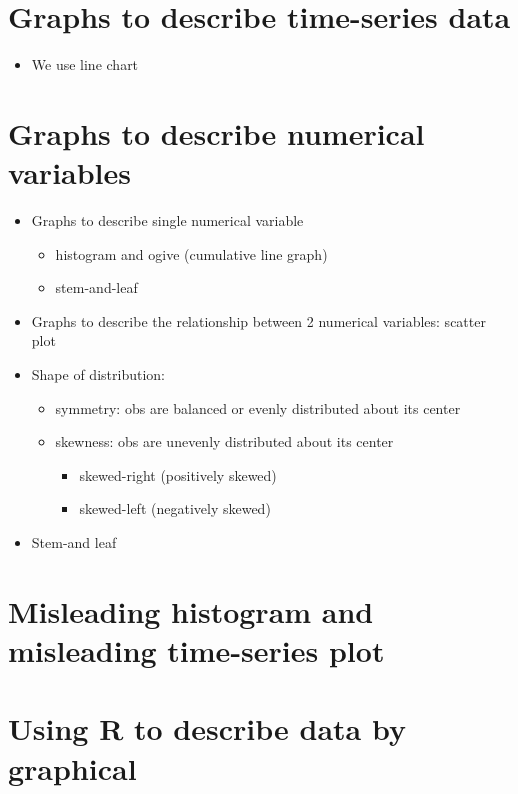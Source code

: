 \documentclass[
]{article}
\providecommand{\tightlist}{%
  \setlength{\itemsep}{0pt}\setlength{\parskip}{0pt}}
\begin{document}
\hypertarget{graphs-to-describe-time-series-data}{%
\section{Graphs to describe time-series
data}\label{graphs-to-describe-time-series-data}}

\begin{itemize}
\tightlist
\item
  We use line chart
\end{itemize}

\hypertarget{graphs-to-describe-numerical-variables}{%
\section{Graphs to describe numerical
variables}\label{graphs-to-describe-numerical-variables}}

\begin{itemize}
\tightlist
\item
  Graphs to describe single numerical variable

  \begin{itemize}
  \tightlist
  \item
    histogram and ogive (cumulative line graph)
  \item
    stem-and-leaf
  \end{itemize}
\item
  Graphs to describe the relationship between 2 numerical variables:
  scatter plot
\item
  Shape of distribution:

  \begin{itemize}
  \tightlist
  \item
    symmetry: obs are balanced or evenly distributed about its center
  \item
    skewness: obs are unevenly distributed about its center

    \begin{itemize}
    \tightlist
    \item
      skewed-right (positively skewed)
    \item
      skewed-left (negatively skewed)
    \end{itemize}
  \end{itemize}
\item
  Stem-and leaf
\end{itemize}

\hypertarget{misleading-histogram-and-misleading-time-series-plot}{%
\section{Misleading histogram and misleading time-series
plot}\label{misleading-histogram-and-misleading-time-series-plot}}

\hypertarget{using-r-to-describe-data-by-graphical}{%
\section{Using R to describe data by
graphical}\label{using-r-to-describe-data-by-graphical}}
\end{document}
